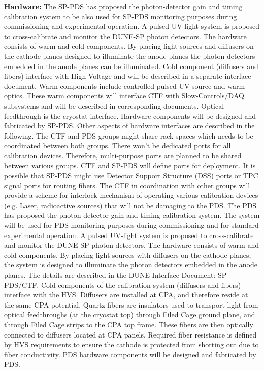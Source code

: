 \textbf{Hardware:} The SP-PDS has proposed the photon-detector gain and timing calibration system to be also used for SP-PDS monitoring purposes during commissioning and experimental operation. A pulsed UV-light system is proposed to cross-calibrate and monitor the DUNE-SP photon detectors. The hardware consists of warm and cold components. By placing light sources and diffusers on the cathode planes designed to illuminate the anode planes the photon detectors embedded in the anode planes can be illuminated. Cold component (diffusers and fibers) interface with High-Voltage and will be described in a separate interface document. Warm components include controlled pulsed-UV source and warm optics. These warm components will interface CTF with Slow-Controls/DAQ subsystems and will be described in corresponding documents. Optical feedthrough is the cryostat interface. Hardware components will be designed and fabricated by SP-PDS. Other aspects of hardware interfaces are described in the following. The CTF and PDS groups might share rack spaces which needs to be coordinated between both groups. There won’t be dedicated ports for all calibration devices. Therefore, multi-purpose ports are planned to be shared between various groups. CTF and SP-PDS will define ports for deployment. It is possible that SP-PDS might use Detector Support Structure (DSS) ports or TPC signal ports for routing fibers. The CTF in coordination with other groups will provide a scheme for interlock mechanism of operating various calibration devices (e.g. Laser, radioactive sources) that will not be damaging to the PDS. The PDS has proposed the photon-detector gain and timing calibration system. The system will be used for PDS monitoring purposes during commissioning and for standard experimental operation. A pulsed UV-light system is proposed to cross-calibrate and monitor the DUNE-SP photon detectors. The hardware consists of warm and cold components. By placing light sources with diffusers on the cathode planes, the system is designed to illuminate the photon detectors embedded in the anode planes. The details are described in the DUNE Interface Document: SP-PDS/CTF. Cold components of the calibration system (diffusers and fibers) interface with the HVS. Diffusers are installed at CPA, and therefore reside at the same CPA potential. Quartz fibers are insulators used to transport light from optical feedthroughs (at the cryostat top) through Filed Cage ground plane, and through Filed Cage strips to the CPA top frame. These fibers are then optically connected to diffusers located at CPA panels. Required fiber resistance is defined by HVS requirements to ensure the cathode is protected from shorting out due to fiber conductivity. PDS hardware components will be designed and fabricated by PDS.

